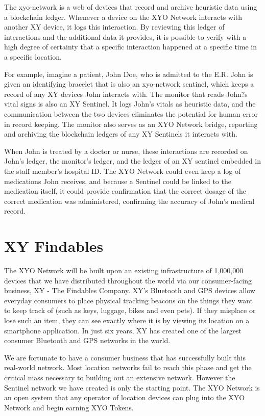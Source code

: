 \documentclass{article}
\begin{document}
The \Gls{xyo-network} is a web of devices that record and archive \gls{heuristic} data using a blockchain ledger. Whenever a device on the XYO Network interacts with another XY device, it logs this interaction. By reviewing this ledger of interactions and the additional data it  provides, it is possible to verify with a high degree of \gls{certainty} that a specific interaction happened at a specific time in a specific location.

For example, imagine a patient, John Doe, who is admitted to the E.R. John is given an identifying bracelet that is also an \Gls{xyo-network} \Gls{sentinel}, which keeps a record of any XY devices John interacts with. The monitor that reads John?s vital signs is also an XY Sentinel. It logs John's vitals as heuristic data, and the communication between the two devices eliminates the potential for human error in record keeping. The monitor also serves as an XYO Network \Gls{bridge}, reporting and archiving the blockchain ledgers of any XY Sentinels it interacts with.

When John is treated by a doctor or nurse, these interactions are recorded on John's ledger, the monitor's ledger, and the ledger of an XY \Gls{sentinel} embedded in the staff member's hospital ID. The XYO Network could even keep a log of medications John receives, and because a Sentinel could be linked to the medication itself, it could provide confirmation that the correct dosage of the correct medication was administered, confirming the accuracy of John's medical record.


\section{XY Findables}

The XYO Network will be built upon an existing infrastructure of 1,000,000 devices that we have distributed throughout the world via our consumer-facing business, XY - The Findables Company. XY's Bluetooth and GPS devices allow everyday consumers to place physical tracking beacons on the things they want to keep track of (such as keys, luggage, bikes and even pets). If they misplace or lose such an item, they can see exactly where it is by viewing its location on a smartphone application. In just six years, XY has created one of the largest consumer Bluetooth and GPS networks in the world.

We are fortunate to have a consumer business that has successfully built this real-world network. Most location networks fail to reach this phase and get the critical mass necessary to building out an extensive network. However the Sentinel network we have created is only the starting point. The XYO Network is an open system that any operator of location devices can plug into the XYO Network and begin earning XYO Tokens.
\end{document}

